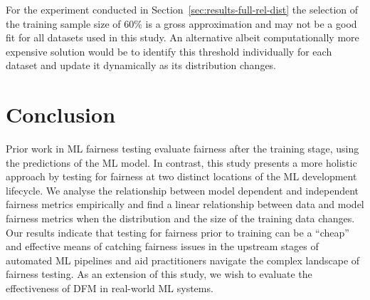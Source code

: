 \documentclass{article}
\begin{document}

For the experiment conducted in
Section \ref{sec:results-full-rel-dist} the selection of the training
sample size of 60\% is a gross approximation and may not be a good fit
for all datasets used in this study. An alternative albeit
computationally more expensive solution would be to identify this
threshold individually for each dataset and update it dynamically as
its distribution changes.

\section{Conclusion}\label{sec:conclude}

Prior work in ML fairness testing evaluate fairness after the training
stage, using the predictions of the ML model. In contrast, this study
presents a more holistic approach by testing for fairness at two
distinct locations of the ML development lifecycle. We analyse the
relationship between model dependent and independent fairness metrics
empirically and find a linear relationship between data and model
fairness metrics when the distribution and the size of the training
data changes. Our results indicate that testing for fairness prior to
training can be a ``cheap'' and effective means of catching fairness
issues in the upstream stages of automated ML pipelines and aid
practitioners navigate the complex landscape of fairness testing. As
an extension of this study, we wish to evaluate the effectiveness of
DFM in real-world ML systems.



\end{document}
